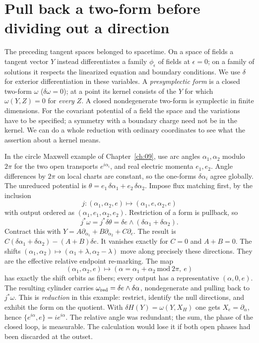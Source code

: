 \section{Pull back a two-form before dividing out a direction}\label{D-reduction}
The preceding tangent spaces belonged to spacetime. On a space of fields a tangent vector $Y$ instead differentiates a family $\phi_\epsilon$ of fields at $\epsilon=0$; on a family of solutions it respects the linearized equation and boundary conditions. We use $\delta$ for exterior differentiation in these variables. A \emph{presymplectic form} is a closed two-form $\omega$ ($\delta\omega=0$); at a point its kernel consists of the $Y$ for which $\omega(Y,Z)=0$ for \emph{every} $Z$. A closed nondegenerate two-form is symplectic in finite dimensions. For the covariant potential of a field the space and the variations have to be specified; a symmetry with a boundary charge need not be in the kernel. We can do a whole reduction with ordinary coordinates to see what the assertion about a kernel means.

In the circle Maxwell example of Chapter~\ref{ch:09}, use arc angles $\alpha_1,\alpha_2$ modulo $2\pi$ for the two open transports $e^{i\alpha_i}$, and real electric momenta $e_1,e_2$. Angle differences by $2\pi$ on local charts are constant, so the one-forms $\delta\alpha_i$ agree globally. The unreduced potential is $\theta=e_1\,\delta\alpha_1+e_2\,\delta\alpha_2$. Impose flux matching first, by the inclusion
\[
 j:(\alpha_1,\alpha_2,e)\longmapsto(\alpha_1,e,\alpha_2,e)
\]
with output ordered as $(\alpha_1,e_1,\alpha_2,e_2)$. Restriction of a form is pullback, so
\[
 j^*\omega=j^*\delta\theta=\delta e\wedge(\delta\alpha_1+\delta\alpha_2).
\]
Contract this with $Y=A\partial_{\alpha_1}+B\partial_{\alpha_2}+C\partial_e$. The result is $C(\delta\alpha_1+\delta\alpha_2)-(A+B)\delta e$. It vanishes exactly for $C=0$ and $A+B=0$. The shifts $(\alpha_1,\alpha_2)\mapsto(\alpha_1+\lambda,\alpha_2-\lambda)$ move along precisely these directions. They are the effective relative endpoint re-marking. The map
\[
 (\alpha_1,\alpha_2,e)\longmapsto(\alpha=\alpha_1+\alpha_2\ \mathrm{mod}\ 2\pi,\ e)
\]
has exactly the shift orbits as fibers; every output has a representative $(\alpha,0,e)$. The resulting cylinder carries $\omega_{\rm red}=\delta e\wedge\delta\alpha$, nondegenerate and pulling back to $j^*\omega$. This is \emph{reduction} in this example: restrict, identify the null directions, and exhibit the form on the quotient. With $\delta H(Y)=\omega(Y,X_H)$ one gets $X_e=\partial_\alpha$, hence $\{e^{i\alpha},e\}=i e^{i\alpha}$. The relative angle was redundant; the sum, the phase of the closed loop, is measurable. The calculation would lose it if both open phases had been discarded at the outset.

